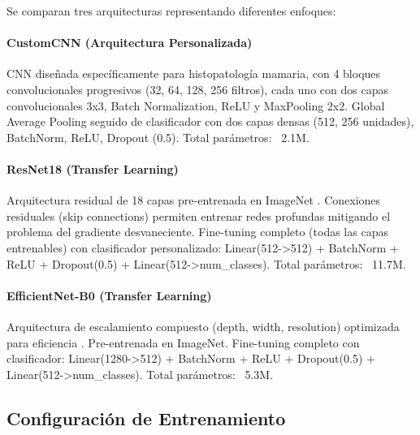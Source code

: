 \documentclass[12pt,a4paper]{article}
\begin{document}
Se comparan tres arquitecturas representando diferentes enfoques:

\paragraph{CustomCNN (Arquitectura Personalizada)} 
CNN diseñada específicamente para histopatología mamaria, con 4 bloques convolucionales 
progresivos (32, 64, 128, 256 filtros), cada uno con dos capas convolucionales 3x3, 
Batch Normalization, ReLU y MaxPooling 2x2. Global Average Pooling seguido de 
clasificador con dos capas densas (512, 256 unidades), BatchNorm, ReLU, Dropout (0.5). 
Total parámetros: ~2.1M.

\paragraph{ResNet18 (Transfer Learning)}
Arquitectura residual de 18 capas pre-entrenada en ImageNet \cite{he2016deep}. 
Conexiones residuales (skip connections) permiten entrenar redes profundas mitigando 
el problema del gradiente desvaneciente. Fine-tuning completo (todas las capas entrenables) 
con clasificador personalizado: Linear(512->512) + BatchNorm + ReLU + Dropout(0.5) + Linear(512->num\_classes). 
Total parámetros: ~11.7M.

\paragraph{EfficientNet-B0 (Transfer Learning)}
Arquitectura de escalamiento compuesto (depth, width, resolution) optimizada para eficiencia 
\cite{tan2019efficientnet}. Pre-entrenada en ImageNet. Fine-tuning completo con 
clasificador: Linear(1280->512) + BatchNorm + ReLU + Dropout(0.5) + Linear(512->num\_classes). 
Total parámetros: ~5.3M.

\subsection{Configuración de Entrenamiento}
\end{document}
